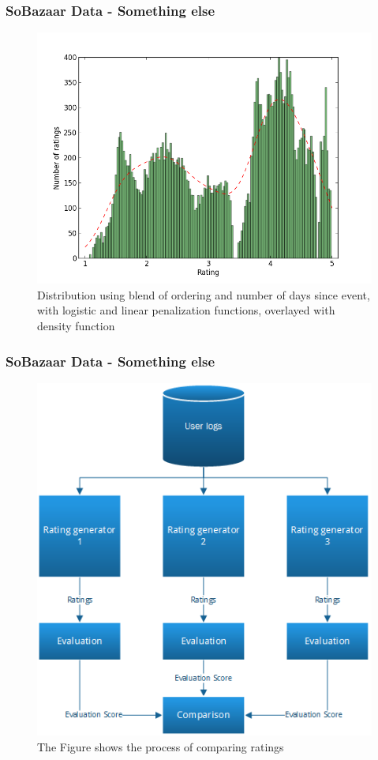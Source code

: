 \documentclass{beamer}
\begin{document}
  \begin{frame}
    \frametitle{SoBazaar Data - Something else}
    \begin{figure}[H]
        \includegraphics[scale=0.4]{../src/image/dist-blend}
        \centering
    \caption{Distribution using blend of ordering and number of days since event, with logistic and linear penalization functions, overlayed with density function}
    \end{figure}
  \end{frame}

  \begin{frame}
    \frametitle{SoBazaar Data - Something else}
    \begin{figure}[H]
        \includegraphics[scale=0.4]{../src/image/ratinggeneval.png}
        \centering
        \caption[Comparing Ratings]{The Figure shows the process of comparing ratings}
    \label{figure:eventIDDistribution}
    \end{figure}
  \end{frame}
\end{document}

